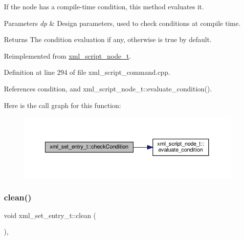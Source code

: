 If the node has a compile-\/time condition, this method evaluates it. 


\begin{DoxyParams}{Parameters}
{\em dp} & Design parameters, used to check conditions at compile time. \\
\hline
\end{DoxyParams}
\begin{DoxyReturn}{Returns}
The condition evaluation if any, otherwise is true by default. 
\end{DoxyReturn}


Reimplemented from \hyperlink{classxml__script__node__t_a13fbe7caa7bed64ab3cc25d51392523d}{xml\+\_\+script\+\_\+node\+\_\+t}.



Definition at line 294 of file xml\+\_\+script\+\_\+command.\+cpp.



References condition, and xml\+\_\+script\+\_\+node\+\_\+t\+::evaluate\+\_\+condition().

Here is the call graph for this function\+:
\nopagebreak
\begin{figure}[H]
\begin{center}
\leavevmode
\includegraphics[width=350pt]{d1/d5b/classxml__set__entry__t_a85ffc00f525e4b5425f60c2908d1bd83_cgraph}
\end{center}
\end{figure}
\mbox{\label{classxml__set__entry__t_ac996d3a7900d2deceeee5efcea48bb3a}} 
\subsubsection{\texorpdfstring{clean()}{clean()}}
{\footnotesize\ttfamily void xml\+\_\+set\+\_\+entry\+\_\+t\+::clean (\begin{DoxyParamCaption}{ }\end{DoxyParamCaption})\hspace{0.3cm}{\ttfamily [override]}, {\ttfamily [virtual]}}



